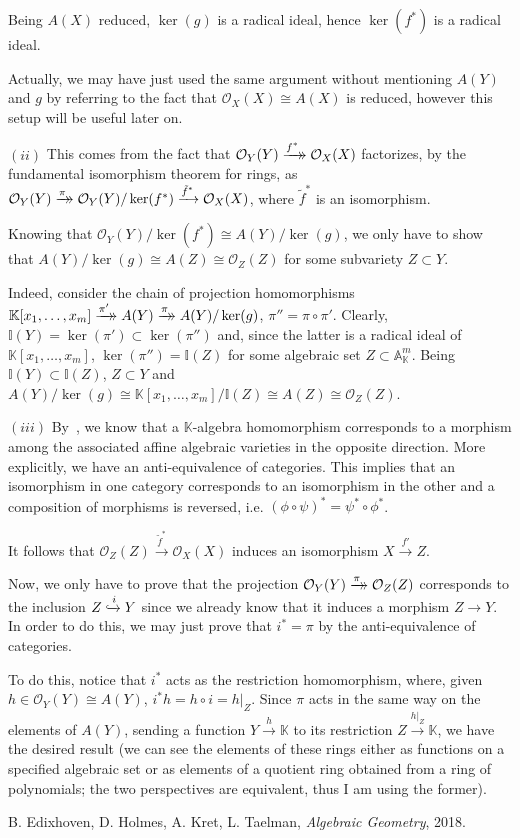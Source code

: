 \documentclass{article}
\newcommand{\numberset}{\mathbb}
\newcommand{\K}{\numberset{K}}
\newcommand{\I}{\mathbb{I}}
\newcommand{\A}{\mathbb{A}}
\newcommand\dhxrightarrow[2][]{%
		\mathrel{\ooalign{$\xrightarrow[#1\mkern4mu]{#2\mkern4mu}$\cr%
		\hidewidth$\rightarrow\mkern4mu$}}
}
\begin{document}
Being $A(X)$ reduced, $\ker(g)$ is a radical ideal, hence $\ker(f^*)$ is a radical ideal.

Actually, we may have just used the same argument without mentioning $A(Y)$ and $g$ by referring to the fact that $\mathcal{O}_X(X)\cong A(X)$ is reduced, however this setup will be useful later on.

$(ii)$ This comes from the fact that $\mathcal{O}_Y(Y)\dhxrightarrow{f^*}\mathcal{O}_X(X)$ factorizes, by the fundamental isomorphism theorem for rings, as $\mathcal{O}_Y(Y)\dhxrightarrow{\pi}\mathcal{O}_Y(Y)/\ker(f^*)\xrightarrow{\tilde f^*}\mathcal{O}_X(X)$, where $\tilde f^*$ is an isomorphism.

Knowing that $\mathcal{O}_Y(Y)/\ker(f^*)\cong A(Y)/\ker(g)$, we only have to show that $A(Y)/\ker(g)\cong A(Z)\cong\mathcal{O}_Z(Z)$ for some subvariety $Z\subset Y$.

Indeed, consider the chain of projection homomorphisms $\K[x_1,\ldots,x_m]\dhxrightarrow{\pi'} A(Y)\dhxrightarrow{\pi} A(Y)/\ker(g)$, $\pi''=\pi\circ\pi'$. Clearly, $\I(Y)=\ker(\pi')\subset\ker(\pi'')$ and, since the latter is a radical ideal of $\K[x_1,\ldots,x_m]$, $\ker(\pi'')=\I(Z)$ for some algebraic set $Z\subset\A^m_{\K}$. Being $\I(Y)\subset\I(Z)$, $Z\subset Y$ and $A(Y)/\ker(g)\cong\K[x_1,\ldots,x_m]/\I(Z)\cong A(Z)\cong\mathcal{O}_Z(Z)$.

$(iii)$ By~\cite[thm. 5.1.5]{edix}, we know that a $\K$-algebra homomorphism corresponds to a morphism among the associated affine algebraic varieties in the opposite direction. More explicitly, we have an anti-equivalence of categories. This implies that an isomorphism in one category corresponds to an isomorphism in the other and a composition of morphisms is reversed, i.e. $(\phi\circ\psi)^*=\psi^*\circ\phi^*$.

It follows that $\mathcal{O}_Z(Z)\xrightarrow{\tilde f^*}\mathcal{O}_X(X)$ induces an isomorphism $X\xrightarrow{f'}Z$.

Now, we only have to prove that the projection $\mathcal{O}_Y(Y)\dhxrightarrow{\pi}\mathcal{O}_Z(Z)$ corresponds to the inclusion $Z\xhookrightarrow{i} Y$ since we already know that it induces a morphism $Z\rightarrow Y$. In order to do this, we may just prove that $i^*=\pi$ by the anti-equivalence of categories.

To do this, notice that $i^*$ acts as the restriction homomorphism, where, given $h\in\mathcal{O}_Y(Y)\cong A(Y)$, $i^*h=h\circ i=h|_Z$. Since $\pi$ acts in the same way on the elements of $A(Y)$, sending a function $Y\xrightarrow{h}\K$ to its restriction $Z\xrightarrow{h|_Z}\K$, we have the desired result (we can see the elements of these rings either as functions on a specified algebraic set or as elements of a quotient ring obtained from a ring of polynomials; the two perspectives are equivalent, thus I am using the former).


\begin{thebibliography}{9}
	B. Edixhoven, D. Holmes, A. Kret, L. Taelman,
	\textit{Algebraic Geometry},
	2018.
\end{thebibliography}
\end{document}
